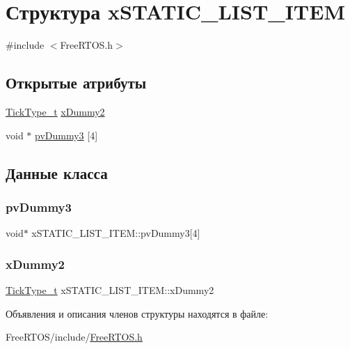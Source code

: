 \hypertarget{structx_s_t_a_t_i_c___l_i_s_t___i_t_e_m}{}\section{Структура x\+S\+T\+A\+T\+I\+C\+\_\+\+L\+I\+S\+T\+\_\+\+I\+T\+EM}
\label{structx_s_t_a_t_i_c___l_i_s_t___i_t_e_m}


{\ttfamily \#include $<$Free\+R\+T\+O\+S.\+h$>$}

\subsection*{Открытые атрибуты}
\begin{DoxyCompactItemize}
\item 
\mbox{\hyperlink{portmacro_8h_aa69c48c6e902ce54f70886e6573c92a9}{Tick\+Type\+\_\+t}} \mbox{\hyperlink{structx_s_t_a_t_i_c___l_i_s_t___i_t_e_m_a902f5a362987a85e76338f233e16817e}{x\+Dummy2}}
\item 
void $\ast$ \mbox{\hyperlink{structx_s_t_a_t_i_c___l_i_s_t___i_t_e_m_ac8df611d8ab21275ef688b0ca7ca352c}{pv\+Dummy3}} \mbox{[}4\mbox{]}
\end{DoxyCompactItemize}


\subsection{Данные класса}
\mbox{\label{structx_s_t_a_t_i_c___l_i_s_t___i_t_e_m_ac8df611d8ab21275ef688b0ca7ca352c}} 
\subsubsection{\texorpdfstring{pvDummy3}{pvDummy3}}
{\footnotesize\ttfamily void$\ast$ x\+S\+T\+A\+T\+I\+C\+\_\+\+L\+I\+S\+T\+\_\+\+I\+T\+E\+M\+::pv\+Dummy3\mbox{[}4\mbox{]}}

\mbox{\label{structx_s_t_a_t_i_c___l_i_s_t___i_t_e_m_a902f5a362987a85e76338f233e16817e}} 
\subsubsection{\texorpdfstring{xDummy2}{xDummy2}}
{\footnotesize\ttfamily \mbox{\hyperlink{portmacro_8h_aa69c48c6e902ce54f70886e6573c92a9}{Tick\+Type\+\_\+t}} x\+S\+T\+A\+T\+I\+C\+\_\+\+L\+I\+S\+T\+\_\+\+I\+T\+E\+M\+::x\+Dummy2}



Объявления и описания членов структуры находятся в файле\+:\begin{DoxyCompactItemize}
\item 
Free\+R\+T\+O\+S/include/\mbox{\hyperlink{_free_r_t_o_s_8h}{Free\+R\+T\+O\+S.\+h}}\end{DoxyCompactItemize}
